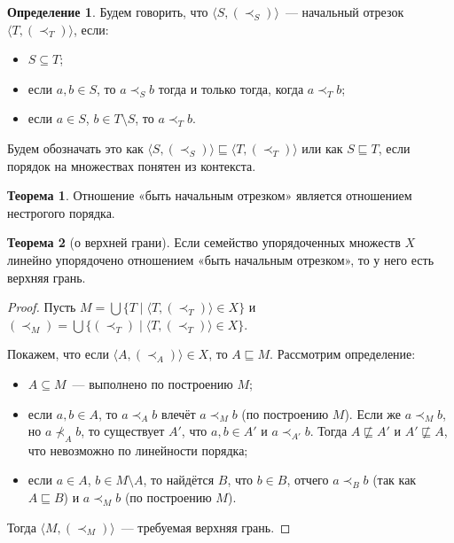 \documentclass[a4paper,11pt]{article}
\theoremstyle{definition}
\newtheorem*{thm}{Теорема}
\newtheorem*{dfn}{Определение}
\begin{document}
\begin{dfn}
Будем говорить, что $\langle S, (\prec_S)\rangle$~--- начальный отрезок $\langle
T, (\prec_T)\rangle$, если:
\begin{itemize}
\item $S \subseteq T$;
\item если $a, b \in S$, то $a \prec_S b$ тогда и только тогда, когда $a \prec_T
  b$;
\item если $a \in S$, $b \in T \setminus S$, то $a \prec_T b$.
\end{itemize}
Будем обозначать это как $\langle S, (\prec_S)\rangle \sqsubseteq \langle T,
(\prec_T)\rangle$ или как $S \sqsubseteq T$, если порядок на множествах понятен
из контекста.
\end{dfn}
\begin{thm}
Отношение «быть начальным отрезком» является отношением нестрогого порядка.
\end{thm}
\begin{thm}[о верхней грани]
Если семейство упорядоченных множеств $X$ линейно упорядочено отношением «быть
начальным отрезком», то у него есть верхняя грань.
\end{thm}
\begin{proof}
Пусть $M = \bigcup\{T \mid \langle T, (\prec_T)\rangle \in X\}$ и $(\prec_M) =
\bigcup\{(\prec_T) \mid \langle T, (\prec_T)\rangle \in X\}$.

Покажем, что если $\langle A, (\prec_A)\rangle \in X$, то $A \sqsubseteq M$.
Рассмотрим определение:
\begin{itemize}
\item $A \subseteq M$~--- выполнено по построению $M$;
\item если $a, b \in A$, то $a \prec_A b$ влечёт $a \prec_M b$ (по построению
  $M$). Если же $a \prec_M b$, но $a \nprec_A b$, то существует $A'$, что $a, b
  \in A'$ и $a \prec_{A'} b$. Тогда $A \not\sqsubseteq A'$ и $A' \not\sqsubseteq
  A$, что невозможно по линейности порядка;
\item если $a \in A$, $b \in M \setminus A$, то найдётся $B$, что $b \in B$,
  отчего $a \prec_B b$ (так как $A \sqsubseteq B$) и $a \prec_M b$ (по
  построению $M$).
\end{itemize}
Тогда $\langle M, (\prec_M)\rangle$~--- требуемая верхняя грань.
\end{proof}
\end{document}
